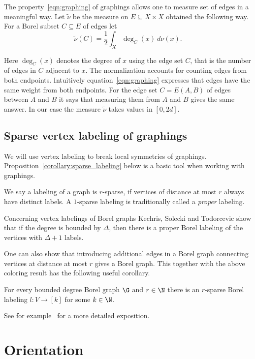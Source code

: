 The property~\eqref{eqn:graphing} of graphings allows one to measure set of edges in a meaningful way. Let $\widetilde{\nu}$ be the measure on $E \subseteq X \times X$ obtained the following way. For a Borel subset $C \subseteq E$ of edges let
\[
\widetilde{\nu} (C) = \frac{1}{2} \int_{X} \deg_{C}(x) \ d \nu(x).
\]

Here $\deg_{C}(x)$ denotes the degree of $x$ using the edge set $C$, that is the number of edges in $C$ adjacent to $x$. The normalization accounts for counting edges from both endpoints. Intuitively equation~\eqref{eqn:graphing} expresses that edges have the same weight from both endpoints. For the edge set $C=E(A,B)$ of edges between $A$ and $B$ it says that measuring them from $A$ and $B$ gives the same answer. In our case the measure $\widetilde{\nu}$ takes values in $[0,2d]$.

\subsection{Sparse vertex labeling of graphings}

We will use vertex labeling to break local symmetries of graphings. Proposition~\ref{corollary:sparse_labeling} below is a basic tool when working with graphings.

We say a labeling of a graph is $r$-sparse, if vertices of distance at most $r$ always have distinct labels. A $1$-sparse labeling is traditionally called a \emph{proper} labeling.

Concerning vertex labelings of Borel graphs Kechris, Solecki and Todorcevic \cite[Theorem~4.6]{kechris1999borel} show that if the degree is bounded by $\Delta$, then there is a proper Borel labeling of the vertices with $\Delta+1$ labels.

One can also show that introducing additional edges in a Borel graph connecting vertices at distance at most $r$ gives a Borel graph. This together with the above coloring result has the following useful corollary.

\begin{prop}\label{corollary:sparse_labeling}
For every bounded degree Borel graph $\G$ and $r \in \N$ there is an $r$-sparse Borel labeling $l : V \to [k]$ for some $k \in \N$.
\end{prop}
See for example~\cite[Corollary~3.1]{csoka2016kHonig} for a more detailed exposition.

\section{Orientation} \label{section:orientation}

